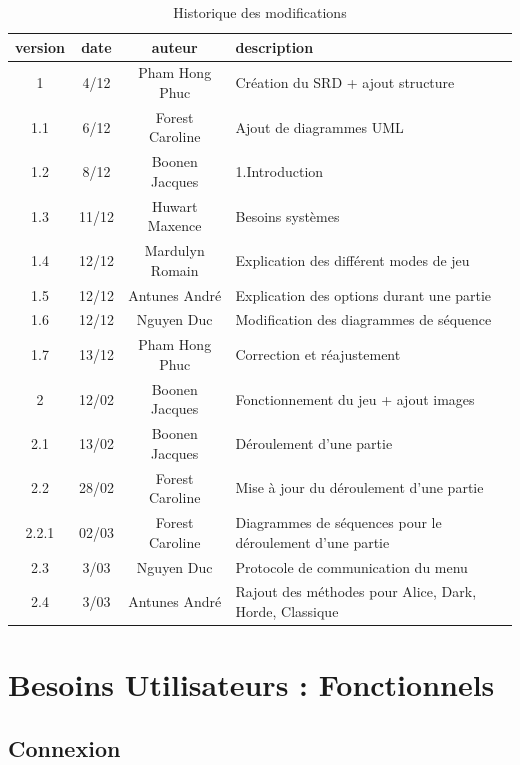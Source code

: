 \documentclass[10pt, a4paper]{article}
\begin{document}
		\begin{table}[h!]

			\centering

			\begin{tabular}{|c|c|c|p{50mm}|}
				\hline
				 \textbf{version} & \textbf{date} & \textbf{auteur}  & \textbf{description} \\ \hline
				 1 & 4/12 & Pham Hong Phuc & Création du SRD + ajout structure\\
				 1.1 & 6/12 & Forest Caroline & Ajout de diagrammes UML\\
				 1.2 & 8/12 & Boonen Jacques & 1.Introduction\\
				 1.3 & 11/12 & Huwart Maxence & Besoins systèmes\\
				 1.4 & 12/12 & Mardulyn Romain & Explication des différent modes de jeu\\
				 1.5 & 12/12 & Antunes André & Explication des options durant une partie\\
         1.6 & 12/12 & Nguyen Duc & Modification des diagrammes de séquence\\
         1.7 & 13/12 & Pham Hong Phuc & Correction et réajustement \\ \hline
				 2 & 12/02 & Boonen Jacques & Fonctionnement du jeu + ajout images \\
				 2.1 & 13/02 & Boonen Jacques & Déroulement d'une partie \\
				 2.2 & 28/02 & Forest Caroline & Mise à jour du déroulement d'une partie \\
				 2.2.1 & 02/03 & Forest Caroline & Diagrammes de séquences pour le déroulement d'une partie \\
				 2.3 & 3/03 & Nguyen Duc & Protocole de communication du menu \\
				 2.4 & 3/03 & Antunes André & Rajout des méthodes pour Alice, Dark, Horde, Classique \\
				\hline
\end{tabular}
			\caption*{Historique des modifications}
			\end{table}
\clearpage


\section{Besoins Utilisateurs : Fonctionnels}


\subsection{Connexion}
\end{document}
